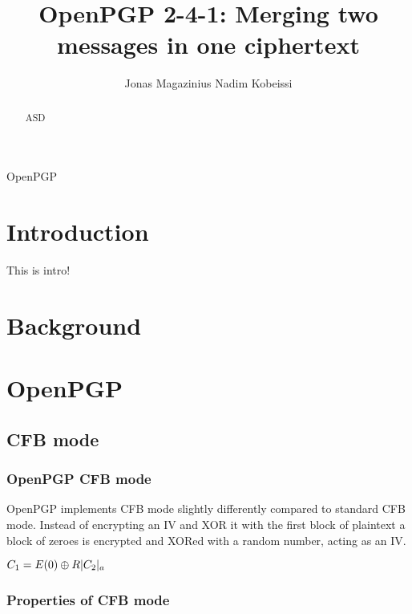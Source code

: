 \documentclass[runningheads,a4paper]{llncs}[2018/03/10]
\newif\ifanon
\begin{document}
\ifanon
\else
	\author{Jonas Magazinius Nadim Kobeissi}
\fi

\title{OpenPGP 2-4-1: Merging two messages in one ciphertext}
\maketitle

\begin{abstract}
	{ASD}
\end{abstract}

\begin{keywords}
	OpenPGP
\end{keywords}

\section{Introduction}\label{sec:intro}
This is intro!

\section{Background}\label{sec:background}


\section{OpenPGP}\label{sec:openpgp}


\subsection{CFB mode}



\subsubsection{OpenPGP CFB mode}

OpenPGP implements CFB mode slightly differently compared to standard 
CFB mode. Instead of encrypting an IV and XOR it with the first block 
of plaintext a block of zeroes is encrypted and XORed with a random 
number, acting as an IV.

$
C_1 = E(0) \oplus R \\
|C_2|_{a}
$


\subsubsection{Properties of CFB mode}
\end{document}
